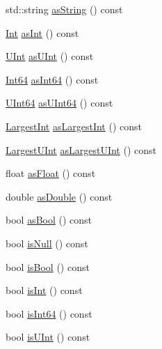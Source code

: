 \begin{DoxyCompactItemize}
\item 
std\-::string \hyperlink{class_json_1_1_value_a03ee3d5df576640c93ba683f140828bd}{as\-String} () const 
\item 
\hyperlink{class_json_1_1_value_abdf7a7ff73eb130ffcab28504ffdb405}{Int} \hyperlink{class_json_1_1_value_ac786e35b860b1d700cb3d3e56dd6a235}{as\-Int} () const 
\item 
\hyperlink{class_json_1_1_value_a0933d59b45793ae4aade1757c322a98d}{U\-Int} \hyperlink{class_json_1_1_value_a2019d1bd296b89356c1b0da5970c918c}{as\-U\-Int} () const 
\item 
\hyperlink{class_json_1_1_value_a1b86af9f85f0f1baa972c3319fa22695}{Int64} \hyperlink{class_json_1_1_value_a4451cee7524534458894f4e2cc045aa3}{as\-Int64} () const 
\item 
\hyperlink{class_json_1_1_value_a8b62564be8c087c6d18de180ff4e13e3}{U\-Int64} \hyperlink{class_json_1_1_value_a4aa617bc0625ae0f208fa54b7c6326ad}{as\-U\-Int64} () const 
\item 
\hyperlink{class_json_1_1_value_a1cbb82642ed05109b9833e49f042ece7}{Largest\-Int} \hyperlink{class_json_1_1_value_a3786bb100c5cf9a98eb6d13784968956}{as\-Largest\-Int} () const 
\item 
\hyperlink{class_json_1_1_value_a6682a3684d635e03fc06ba229fa24eec}{Largest\-U\-Int} \hyperlink{class_json_1_1_value_a692b88345a745b2f89ca5d94b52e94d4}{as\-Largest\-U\-Int} () const 
\item 
float \hyperlink{class_json_1_1_value_ac2128d7080499daf8c5b1c71da243f63}{as\-Float} () const 
\item 
double \hyperlink{class_json_1_1_value_a33434ed1c0217a34d04c95fa5342fd37}{as\-Double} () const 
\item 
bool \hyperlink{class_json_1_1_value_a7402c797285c020566c3db5f8ae4e940}{as\-Bool} () const 
\item 
bool \hyperlink{class_json_1_1_value_aeb9ad8b1bb91bdd72203dc884b3f4362}{is\-Null} () const 
\item 
bool \hyperlink{class_json_1_1_value_a3c3716cc7a0216cb1b654bb8f61c8d13}{is\-Bool} () const 
\item 
bool \hyperlink{class_json_1_1_value_ab0df4746d6787d2ce1db1a156c118f14}{is\-Int} () const 
\item 
bool \hyperlink{class_json_1_1_value_aba89690e5fd72d0f7121a30013470423}{is\-Int64} () const 
\item 
bool \hyperlink{class_json_1_1_value_ae814ca1796fe2d43ac09898b70213989}{is\-U\-Int} () const 
\item 

\end{DoxyCompactItemize}
